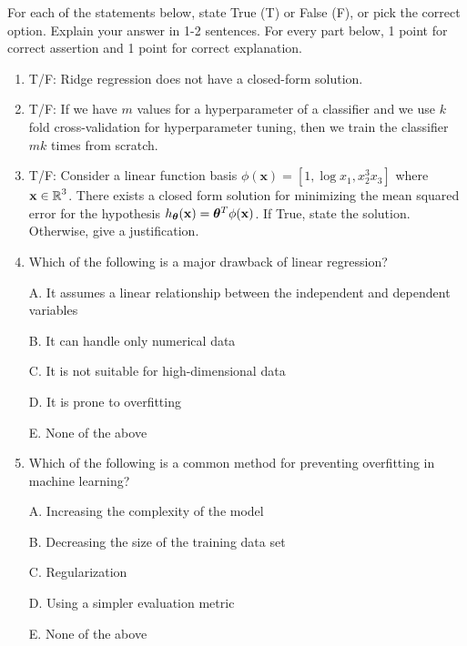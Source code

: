 \documentclass[11pt]{article}
\begin{document}


For each of the statements below, state True (T) or False (F), or pick the correct option. Explain your answer in 1-2 sentences. For every part below, 1 point for correct assertion and 1 point for correct explanation. 

\begin{enumerate}
\item T/F: Ridge regression does not have a closed-form solution. 

\item  T/F: If we have $m$ values for a hyperparameter of a classifier and we use $k$ fold cross-validation for hyperparameter tuning, then we train the classifier $mk$ times from scratch. 

\item T/F: Consider a linear function basis $\phi(\mathbf{x}) = [1, \log x_1, x_2^3 x_3]$ where ${\mathbf{x}}\in\operatorname{\operatorname{\mathbb{R}}}^3$. There exists a closed form solution for minimizing the mean squared error for the hypothesis $h_{\boldsymbol\theta}({\mathbf{x}})= \boldsymbol\theta^T \phi({\mathbf{x}})$. If True, state the solution. Otherwise, give a justification. 

\item Which of the following is a major drawback of linear regression?
    
A. It assumes a linear relationship between the independent and dependent variables

B. It can handle only numerical data

C. It is not suitable for high-dimensional data

D. It is prone to overfitting

E. None of the above


\item Which of the following is a common method for preventing overfitting in machine learning? 

A. Increasing the complexity of the model

B. Decreasing the size of the training data set

C. Regularization

D. Using a simpler evaluation metric

E. None of the above


\end{enumerate}
\newpage
{}
\end{document}

